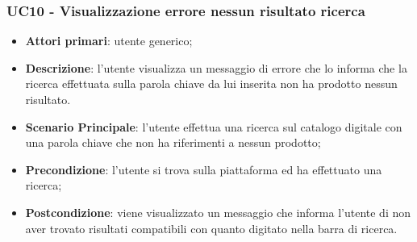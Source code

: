 \subsubsection{UC10 - Visualizzazione errore nessun risultato ricerca}
\begin{itemize}
\item \textbf{Attori primari}: utente generico;
\item \textbf{Descrizione}: l'utente visualizza un messaggio di errore che lo informa che la ricerca effettuata sulla parola chiave da lui inserita non ha prodotto nessun risultato.
\item \textbf{Scenario Principale}: l'utente effettua una ricerca sul catalogo digitale con una parola chiave che non ha riferimenti a nessun prodotto;
\item \textbf{Precondizione}: l'utente si trova sulla piattaforma ed ha effettuato una ricerca;
\item \textbf{Postcondizione}: viene visualizzato un messaggio che informa l'utente di non aver trovato risultati compatibili con quanto digitato nella barra di ricerca.
\end{itemize}
